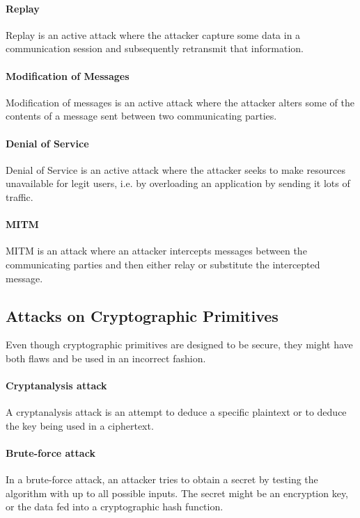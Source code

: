 \documentclass[pdftex,english,10pt,b5paper,twoside]{book}
\begin{document}
\paragraph{Replay} Replay is an active attack where the attacker capture some data in
a communication session and subsequently retransmit that information.

\paragraph{Modification of Messages} Modification of messages is an active
attack where the attacker alters some of the contents of a message sent between
two communicating parties.

\paragraph{Denial of Service} Denial of Service is an active attack where the
attacker seeks to make resources unavailable for legit users, i.e. by
overloading an application by sending it lots of traffic.

\paragraph{\acl{MITM}} \ac{MITM} is an attack where an attacker intercepts messages
between the communicating parties and then either relay or substitute the
intercepted message.

\subsection{Attacks on Cryptographic Primitives}
Even though cryptographic primitives are designed to be secure, they might have
both flaws and be used in an incorrect fashion.

\paragraph{Cryptanalysis attack} A cryptanalysis attack is an attempt to deduce
a specific plaintext or to deduce the key being used in a ciphertext.

\paragraph{Brute-force attack} In a brute-force attack, an attacker tries
to obtain a secret by testing the algorithm with up to all possible inputs. The
secret might be an encryption key, or the data fed into a cryptographic hash
function.
\end{document}
